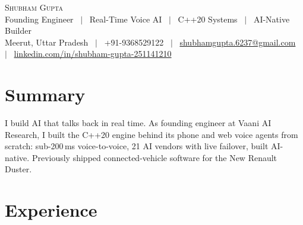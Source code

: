 \documentclass[letterpaper,10pt]{article}
\begin{document}
\begin{center}
  {\Huge \scshape Shubham Gupta} \\ \vspace{2pt}
  {\normalsize Founding Engineer \ $|$ \ Real-Time Voice AI \ $|$ \ C++20 Systems \ $|$ \ AI-Native Builder} \\ \vspace{2pt}
  \small
  Meerut, Uttar Pradesh \ $|$ \
  +91-9368529122 \ $|$ \
  \href{mailto:shubhamgupta.6237@gmail.com}{shubhamgupta.6237@gmail.com} \ $|$ \
  \href{https://www.linkedin.com/in/shubham-gupta-251141210/}{linkedin.com/in/shubham-gupta-251141210}
\end{center}

\section{Summary}
\small
I build AI that talks back in real time. As founding engineer at Vaani AI Research, I built the C++20
engine behind its phone and web voice agents from scratch: sub-200\,ms voice-to-voice, 21 AI vendors
with live failover, built AI-native. Previously shipped connected-vehicle software for the New Renault Duster.

\section{Experience}
\end{document}

